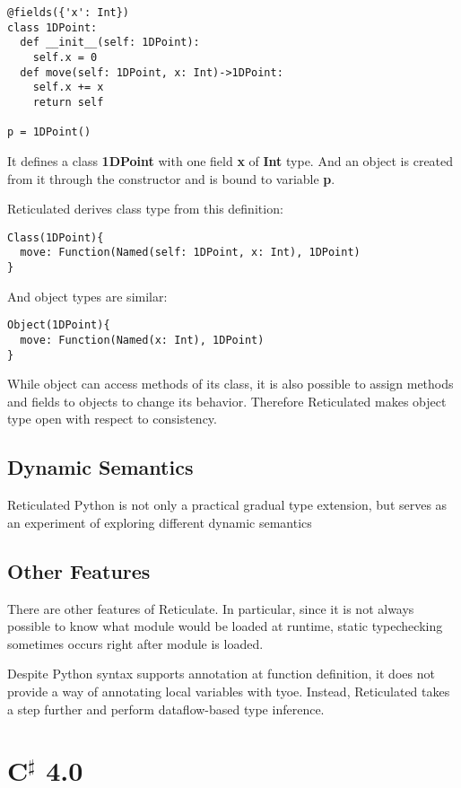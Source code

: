 \begin{verbatim}
@fields({'x': Int})
class 1DPoint:
  def __init__(self: 1DPoint):
    self.x = 0
  def move(self: 1DPoint, x: Int)->1DPoint:
    self.x += x
    return self

p = 1DPoint()
\end{verbatim}

It defines a class \textbf{1DPoint} with one field \textbf{x} of \textbf{Int} type.
And an object is created from it through the constructor
and is bound to variable \textbf{p}.

Reticulated derives class type from this definition:

\begin{verbatim}
Class(1DPoint){
  move: Function(Named(self: 1DPoint, x: Int), 1DPoint)
}
\end{verbatim}

And object types are similar:

\begin{verbatim}
Object(1DPoint){
  move: Function(Named(x: Int), 1DPoint)
}
\end{verbatim}

While object can access methods of its class, it is also possible
to assign methods and fields to objects to change its behavior.
Therefore Reticulated makes object type open with respect to consistency.

\subsection{Dynamic Semantics}

Reticulated Python is not only a practical gradual type extension,
but serves as an experiment of exploring different dynamic semantics

\subsection{Other Features}

There are other features of Reticulate.
In particular, since it is not always possible to know what module would be loaded
at runtime, static typechecking sometimes occurs right after module is loaded.

Despite Python syntax supports annotation at function definition,
it does not provide a way of annotating local variables with tyoe.
Instead, Reticulated takes a step further and perform dataflow-based type inference.

\section{C$^\sharp$ 4.0}

